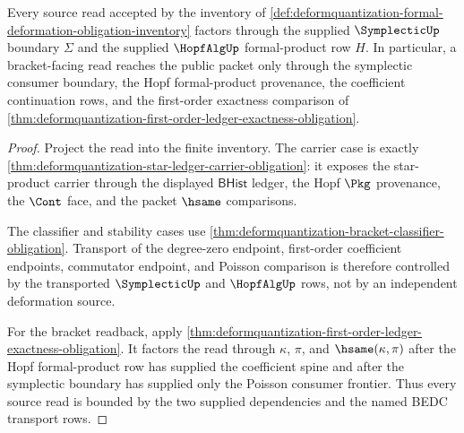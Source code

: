 \begin{theorem}
\label{thm:deformquantization-source-boundary-obligation}
Every source read accepted by the inventory of \autoref{def:deformquantization-formal-deformation-obligation-inventory} factors through the supplied $\SymplecticUp$ boundary $\Sigma$ and the supplied $\HopfAlgUp$ formal-product row $H$. In particular, a bracket-facing read reaches the public packet only through the symplectic consumer boundary, the Hopf formal-product provenance, the coefficient continuation rows, and the first-order exactness comparison of \autoref{thm:deformquantization-first-order-ledger-exactness-obligation}.
\end{theorem}
\begin{proof}
Project the read into the finite inventory. The carrier case is exactly \autoref{thm:deformquantization-star-ledger-carrier-obligation}: it exposes the star-product carrier through the displayed $\mathsf{BHist}$ ledger, the Hopf $\Pkg$ provenance, the $\Cont$ face, and the packet $\hsame$ comparisons.

The classifier and stability cases use \autoref{thm:deformquantization-bracket-classifier-obligation}. Transport of the degree-zero endpoint, first-order coefficient endpoints, commutator endpoint, and Poisson comparison is therefore controlled by the transported $\SymplecticUp$ and $\HopfAlgUp$ rows, not by an independent deformation source.

For the bracket readback, apply \autoref{thm:deformquantization-first-order-ledger-exactness-obligation}. It factors the read through $\kappa$, $\pi$, and $\hsame(\kappa,\pi)$ after the Hopf formal-product row has supplied the coefficient spine and after the symplectic boundary has supplied only the Poisson consumer frontier. Thus every source read is bounded by the two supplied dependencies and the named BEDC transport rows.
\end{proof}

